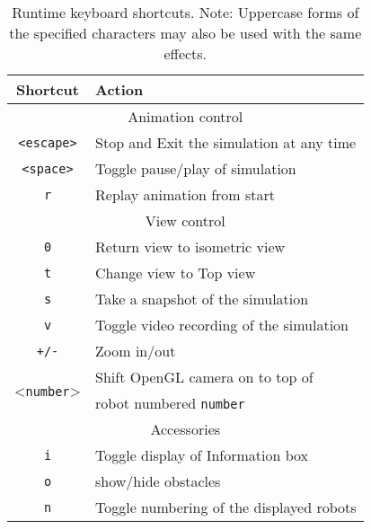 \documentclass[10pt,a4paper]{article}
\begin{document}
\begin{table}[ht]
\centering
\begin{tabular}{| c | l |}
\hline
Shortcut								& Action \\ \hline
\multicolumn{2}{|c|}{Animation control}	\\ \hline
\texttt{\textless escape\textgreater}	& Stop and Exit the simulation at any time \\ \hline
\texttt{\textless space\textgreater}	& Toggle pause/play of simulation \\ \hline
\texttt{r}								& Replay animation from start \\ \hline
\multicolumn{2}{|c|}{View control}		\\ \hline
\texttt{0}								& Return view to isometric view \\ \hline
\texttt{t}								& Change view to Top view \\ \hline
\texttt{s}								& Take a snapshot of the simulation \\ \hline
\texttt{v}								& Toggle video recording of the simulation \\ \hline
\texttt{+/-}							& Zoom in/out \\ \hline
\multirow{2}{*}{\textless\texttt{number}\textgreater} & Shift OpenGL camera on to top of \\ 
	& robot numbered \texttt{number}	\\ \hline
\multicolumn{2}{|c|}{Accessories}		\\ \hline
\texttt{i}								& Toggle display of Information box \\ \hline
\texttt{o}								& show/hide obstacles \\ \hline
\texttt{n}								& Toggle numbering of the displayed robots \\ \hline
\end{tabular}
\caption{\sf Runtime keyboard shortcuts. Note: Uppercase forms of the specified characters may also be used with the same effects.}
\label{keyshort}
\end{table}
\end{document}
